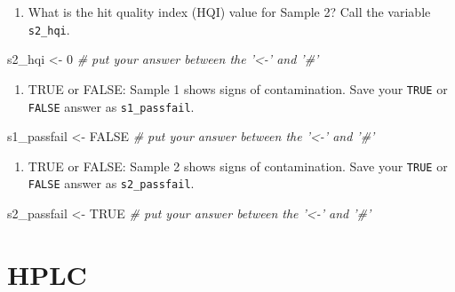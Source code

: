 \documentclass[]{tufte-book}
\newenvironment{Shaded}{}{}
\newcommand{\CommentTok}[1]{\textcolor[rgb]{0.38,0.63,0.69}{\textit{#1}}}
\newcommand{\DecValTok}[1]{\textcolor[rgb]{0.25,0.63,0.44}{#1}}
\newcommand{\NormalTok}[1]{#1}
\newcommand{\OtherTok}[1]{\textcolor[rgb]{0.00,0.44,0.13}{#1}}
\newcommand{\StringTok}[1]{\textcolor[rgb]{0.25,0.44,0.63}{#1}}
\providecommand{\tightlist}{%
  \setlength{\itemsep}{0pt}\setlength{\parskip}{0pt}}
\begin{document}
\begin{enumerate}
\def\labelenumi{\arabic{enumi}.}
\setcounter{enumi}{3}
\tightlist
\item
  What is the hit quality index (HQI) value for Sample 2? Call the variable \texttt{s2\_hqi}.
\end{enumerate}

\begin{Shaded}
\begin{Highlighting}[]
\NormalTok{s2_hqi <-}\StringTok{ }\DecValTok{0}     \CommentTok{# put your answer between the '<-' and '#'}
\end{Highlighting}
\end{Shaded}

\begin{enumerate}
\def\labelenumi{\arabic{enumi}.}
\setcounter{enumi}{4}
\tightlist
\item
  TRUE or FALSE: Sample 1 shows signs of contamination. Save your \texttt{TRUE} or \texttt{FALSE} answer as \texttt{s1\_passfail}.
\end{enumerate}

\begin{Shaded}
\begin{Highlighting}[]
\NormalTok{s1_passfail <-}\StringTok{ }\OtherTok{FALSE}     \CommentTok{# put your answer between the '<-' and '#'}
\end{Highlighting}
\end{Shaded}

\begin{enumerate}
\def\labelenumi{\arabic{enumi}.}
\setcounter{enumi}{5}
\tightlist
\item
  TRUE or FALSE: Sample 2 shows signs of contamination. Save your \texttt{TRUE} or \texttt{FALSE} answer as \texttt{s2\_passfail}.
\end{enumerate}

\begin{Shaded}
\begin{Highlighting}[]
\NormalTok{s2_passfail <-}\StringTok{ }\OtherTok{TRUE}     \CommentTok{# put your answer between the '<-' and '#'}
\end{Highlighting}
\end{Shaded}

\newpage

\hypertarget{hplc}{%
\section{HPLC}\label{hplc}}
\end{document}
